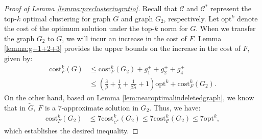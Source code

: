 \documentclass[11pt]{article}
\newcommand{\cost}{\mathrm{cost}}
\newcommand{\calC}{{\mathcal{C}}}
\newcommand{\opt}{{\mathrm{opt}}}
\begin{document}
\begin{CJK*}{UTF8}{gbsn}
\begin{proof}[Proof of Lemma \ref{lemma:preclusteringratio}]
 Recall that $\calC$ and $\calC^*$ represent the top-$k$ optimal clustering for graph $G$ and graph $G_2$, respectively. Let $\opt^k$ denote the cost of the optimum solution under the top-$k$ norm for $G$. When we transfer the graph $G_2$ to $G$, we will incur an increase in the cost of $F$. Lemma \ref{lemma:g+1+2+3} provides the upper bounds on the increase in the cost of $F$, given by:
\begin{align*}
    \cost^k_{F}(G) &\leq \cost^k_{F}(G_2) + g^+_1 + g^+_2 + g^+_4 \\
    &\leq \left(\frac{3}{\beta} + \frac{1}{\lambda} + \frac{1}{\beta\lambda} + 1\right)\opt^k + \cost^k_{F}(G_2).
\end{align*}
On the other hand, based on Lemma \ref{lem:nearoptimalindeletedgraph}, we know that in $\tilde{G}$, $F$ is a $7$-approximate solution in $G_2$. Thus, we have:
\begin{align*}
    \cost^k_{F}(G_2) &\leq 7 \cost^k_{\mathcal{C}^*}(G_2) 
    \leq 7 \cost^k_{\calC}(G_2) 
    \leq 7\opt^k,
\end{align*}
which establishes the desired inequality.
\end{proof}
















































































\end{CJK*}
\end{document}
